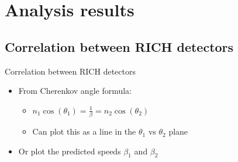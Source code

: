 \documentclass{beamer}
\begin{document}
\section{Analysis results}
\subsection{Correlation between RICH detectors}
\begin{frame}{Correlation between RICH detectors}
  \begin{itemize}
    \item{From Cherenkov angle formula:}
    \begin{itemize}
      \item{$n_1\cos(\theta_1) = \frac{1}{\beta} = n_2\cos(\theta_2)$}
      \item{Can plot this as a line in the $\theta_1$ vs $\theta_2$ plane}
    \end{itemize}
    \item{Or plot the predicted speeds $\beta_1$ and $\beta_2$}
  \end{itemize}
\end{frame}
\end{document}
